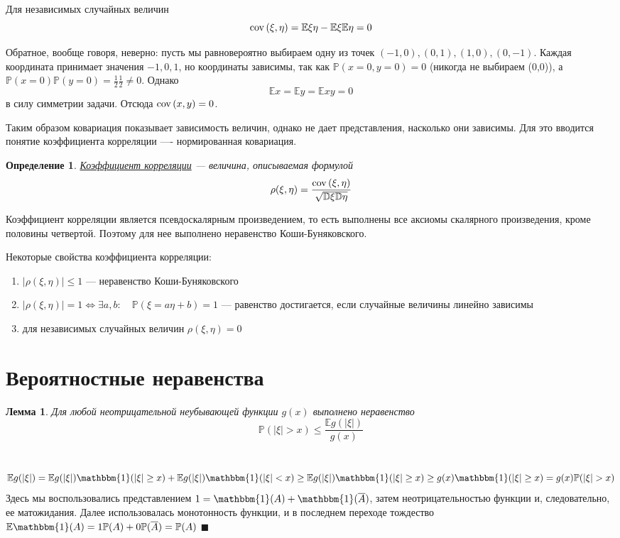 \documentclass[12pt]{article}
\newtheorem{Def}{Определение}
\newtheorem{Lem}{Лемма}
\newenvironment{Proof}{\par\noindent{\bf Доказательство}}{$\blacksquare$}
\numberwithin{Th}{section}
\numberwithin{Def}{section}
\numberwithin{Lem}{section}
\numberwithin{St}{section}
\numberwithin{equation}{section}
\newcommand\Pro{\mathbb{P}} %
\newcommand\Expec{\mathbb{E}} %
\newcommand\Disp{\mathbb{D}}  %
\newcommand\Ind{\mathbbm{1}} %
\newcommand\Cov{{\rm cov \,}} %
\begin{document}
Для независимых случайных величин
$$\Cov(\xi,\eta) = \Expec\xi\eta - \Expec\xi\Expec\eta = 0$$

Обратное, вообще говоря, неверно: пусть мы равновероятно выбираем одну из точек $(-1, 0), (0, 1), (1, 0), (0, -1)$. Каждая координата принимает значения $-1, 0, 1$, но координаты зависимы, так как $\Pro(x=0,  y=0) = 0$ (никогда не выбираем (0,0)), а $\Pro(x=0)\Pro(y=0) = \frac12\frac12 \not=0$. Однако
$$\Expec x = \Expec y = \Expec xy = 0$$ в силу симметрии задачи. Отсюда $\Cov(x,y) = 0$.

Таким образом ковариация показывает зависимость величин, однако не дает представления, насколько они зависимы. Для это вводится понятие коэффициента корреляции ---- нормированная ковариация.

\begin{Def}
\underline{Коэффициент корреляции} --- величина, описываемая формулой
$$\rho(\xi, \eta) = \frac{\Cov(\xi, \eta)}{\sqrt{\Disp\xi\Disp\eta}}$$
\end{Def}

Коэффициент корреляции является псевдоскалярным произведением, то есть выполнены все аксиомы скалярного произведения, кроме половины четвертой. Поэтому для нее выполнено неравенство Коши-Буняковского.

Некоторые свойства коэффициента корреляции:
\begin{enumerate}
	\item $|\rho(\xi, \eta)| \le 1$ --- неравенство Коши-Буняковского
	\item $|\rho(\xi, \eta)| = 1 \Leftrightarrow \exists a, b \colon \quad \Pro(\xi = a\eta + b) = 1$ --- равенство достигается, если случайные величины линейно зависимы
	\item для независимых случайных величин $\rho(\xi, \eta) = 0$
\end{enumerate} 



\newpage
\section{Вероятностные неравенства}
\begin{Lem}
Для любой неотрицательной неубывающей функции $g(x)$ выполнено неравенство 
$$\Pro(|\xi| > x) \le \frac{\Expec g(|\xi|)}{g(x)}$$
\end{Lem}
\begin{Proof} \\
$$\Expec g(|\xi|) = \Expec g(|\xi|) \Ind(|\xi| \ge x) + \Expec g(|\xi|) \Ind(|\xi| < x) \ge \Expec g(|\xi|) \Ind(|\xi| \ge x) \ge g(x)\Ind(|\xi| \ge x) = g(x)\Pro(|\xi| > x)$$
Здесь мы воспользовались представлением $1 = \Ind(A) + \Ind(\overline{A})$, затем неотрицательностью функции и, следовательно, ее матожидания. Далее использовалась монотонность функции, и в последнем переходе тождество $\Expec \Ind(A) = 1 \Pro(A) + 0 \Pro(\overline{A}) = \Pro(A)$
\end{Proof}
\end{document}
